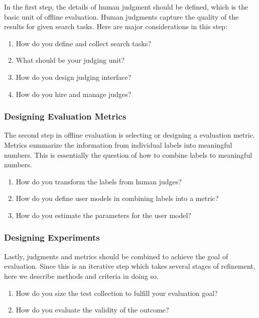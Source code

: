 In the first step, the details of human judgment should be defined, which is the basic unit of offline evaluation. Human judgments capture the quality of the results for given search tasks. Here are major considerations in this step:

\begin{enumerate}
	\item How do you define and collect search tasks?
	\item What should be your judging unit?
	\item How do you design judging interface?
	\item How do you hire and manage judges?%
\end{enumerate}

\subsubsection{Designing Evaluation Metrics}

The second step in offline evaluation is selecting or designing a  evaluation metric. Metrics summarize the information from individual labels into meaningful numbers. This is essentially the question of how to combine labels to meaningful numbers.

\begin{enumerate}
	\item How do you transform the labels from human judges?
	\item How do you define user models in combining labels into a metric? 
	\item How do you estimate the parameters for the user model?
\end{enumerate}

\subsubsection{Designing Experiments}
Lastly, judgments and metrics should be combined to achieve the goal of evaluation. Since this is an iterative step which takes several stages of refinement, here we describe methods and criteria in doing so. 


\begin{enumerate}
	\item How do you size the test collection to fulfill your evaluation goal?
	\item How do you evaluate the validity of the outcome?
\end{enumerate}

